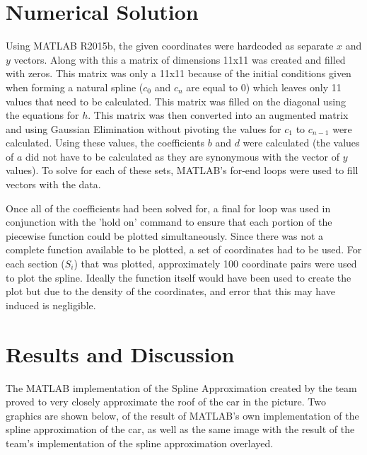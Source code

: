 \documentclass[12pt, letterpaper]{article} %
\begin{document}
\section{Numerical Solution}
Using MATLAB R2015b, the given coordinates were hardcoded as separate $x$ and $y$ vectors. Along with this a matrix of dimensions 11x11 was created and filled with zeros. This matrix was only a 11x11 because of the initial conditions given when forming a natural spline ($c_0$ and $c_n$ are equal to 0) which leaves only 11 values that need to be calculated. This matrix was filled on the diagonal using the equations for $h$. This matrix was then converted into an augmented matrix and using Gaussian Elimination without pivoting the values for $c_1$ to $c_{n-1}$ were calculated. Using these values, the coefficients $b$ and $d$ were calculated (the values of $a$ did not have to be calculated as they are synonymous with the vector of $y$ values). To solve for each of these sets, MATLAB's for-end loops were used to fill vectors with the data. 

Once all of the coefficients had been solved for, a final for loop was used in conjunction with the 'hold on' command to ensure that each portion of the piecewise function could be plotted simultaneously. Since there was not a complete function available to be plotted, a set of coordinates had to be used. For each section ($S_i$) that was plotted, approximately 100 coordinate pairs were used to plot the spline. Ideally the function itself would have been used to create the plot but due to the density of the coordinates, and error that this may have induced is negligible. 

\section{Results and Discussion}
The MATLAB implementation of the Spline Approximation created by the team proved to very closely approximate the roof of the car in the picture. Two graphics are shown below, of the result of MATLAB's own implementation of the spline approximation of the car, as well as the same image with the result of the team's implementation of the spline approximation overlayed.
\end{document}
